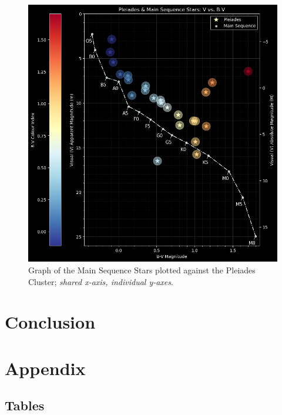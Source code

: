 \documentclass[12pt]{article}
\begin{document}
\begin{figure}[H]
    \centering
    \includegraphics[width=12.5cm]{pleiadesms graph.png}
    \caption{\centering Graph of the Main Sequence Stars plotted against the Pleiades Cluster; \textit{shared x-axis, individual y-axes}.}
    \label{fig:pleimsgraph}
\end{figure}

\section{Conclusion} \label{sec:4}


\newpage



 \label{sec:ref}

\vspace{1.5cm}

\listoffigures

\listoftables

\newpage

\section*{Appendix} \label{sec:A}

\subsection*{Tables}
\end{document}
